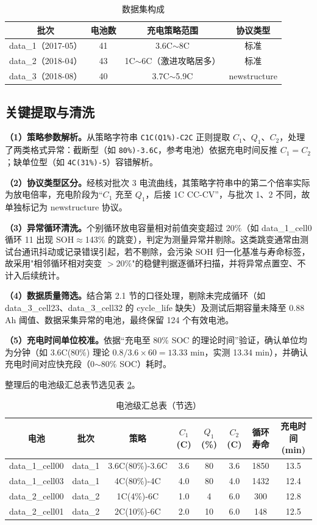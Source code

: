 \documentclass[withoutpreface]{cumcmthesis}
\begin{document}
\begin{table}[htbp]
\centering
\caption{数据集构成}
\label{tab:data}
\begin{tabular}{cccc}
\toprule
批次 & 电池数 & 充电策略范围 & 协议类型 \\
\midrule
data\_1（2017-05） & 41 & 3.6C$\sim$8C & 标准 \\
data\_2（2018-04） & 43 & 1C$\sim$6C（激进攻略居多） & 标准 \\
data\_3（2018-08） & 40 & 3.7C$\sim$5.9C & newstructure \\
\bottomrule
\end{tabular}
\end{table}

\subsection{关键提取与清洗}

\textbf{（1）策略参数解析。}从策略字符串 \texttt{C1C(Q1\%)-C2C} 正则提取 $C_1$、$Q_1$、$C_2$，处理了两类格式异常：截断型（如 \texttt{80\%)-3.6C}，参考电池）依据充电时间反推 $C_1=C_2$；缺单位型（如 \texttt{4C(31\%)-5}）容错解析。

\textbf{（2）协议类型区分。}经核对批次 3 电流曲线，其策略字符串中的第二个倍率实际为放电倍率，充电阶段为“$C_1$ 充至 $Q_1$，后接 1C CC-CV”，与批次 1、2 不同，故单独标记为 newstructure 协议。

\textbf{（3）异常循环清洗。}个别循环放电容量相对前值突变超过 20\%（如 data\_1\_cell0 循环 11 出现 SOH$\approx$143\% 的跳变），判定为测量异常并剔除。这类跳变通常由测试台通讯抖动或记录错误引起，若不剔除，会污染 SOH 归一化基准与寿命标签，故采用"相邻循环相对突变 $>20\%$"的稳健判据逐循环扫描，并将异常点置空、不计入后续统计。

\textbf{（4）数据质量筛选。}结合第 2.1 节的口径处理，剔除未完成循环（如 data\_3\_cell23、data\_3\_cell32 的 cycle\_life 缺失）及测试后期容量未降至 0.88 Ah 阈值、数据采集异常的电池，最终保留 124 个有效电池。

\textbf{（5）充电时间单位校准。}依据“充电至 80\% SOC 的理论时间”验证，确认单位均为分钟（如 3.6C(80\%) 理论 $0.8/3.6\times60=13.33$ min，实测 13.34 min），并确认充电时间对应快充段（0$\sim$80\% SOC）耗时。

整理后的电池级汇总表节选见表 \ref{tab:battery}。

\begin{table}[htbp]
\centering
\caption{电池级汇总表（节选）}
\label{tab:battery}
\begin{tabular}{cccccccc}
\toprule
电池 & 批次 & 策略 & $C_1$(C) & $Q_1$(\%) & $C_2$(C) & 循环寿命 & 充电时间(min) \\
\midrule
data\_1\_cell00 & data\_1 & 3.6C(80\%)-3.6C & 3.6 & 80 & 3.6 & 1850 & 13.5 \\
data\_1\_cell03 & data\_1 & 4C(80\%)-4C & 4.0 & 80 & 4.0 & 1432 & 12.4 \\
data\_2\_cell00 & data\_2 & 1C(4\%)-6C & 1.0 & 4 & 6.0 & 300 & 12.8 \\
data\_2\_cell01 & data\_2 & 2C(10\%)-6C & 2.0 & 10 & 6.0 & 148 & 12.5 \\
\bottomrule
\end{tabular}
\end{table}
\end{document}
